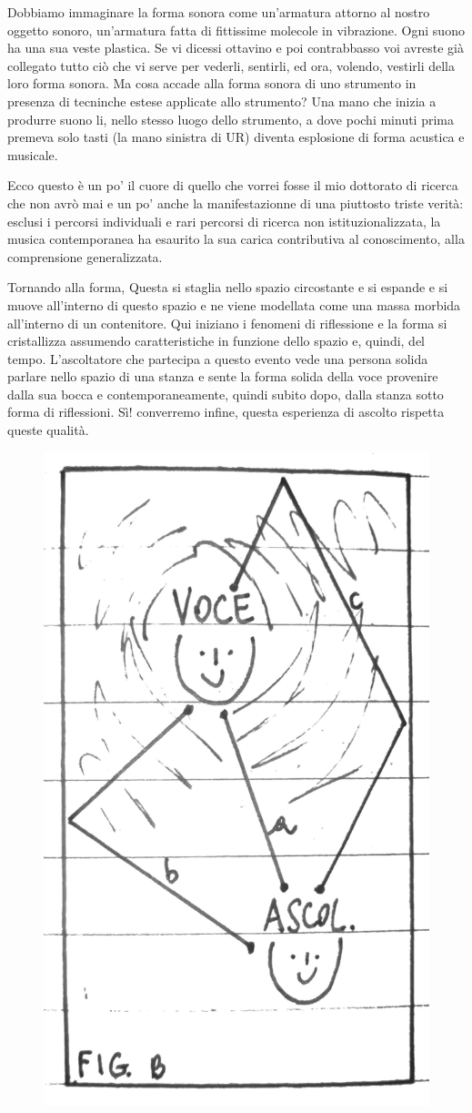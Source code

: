 Dobbiamo immaginare la forma sonora come un'armatura attorno al nostro oggetto
sonoro, un'armatura fatta di fittissime molecole in vibrazione. Ogni suono ha una
sua veste plastica. Se vi dicessi ottavino e poi contrabbasso voi avreste già
collegato tutto ciò che vi serve per vederli, sentirli, ed ora, volendo, vestirli
della loro forma sonora. Ma cosa accade alla forma sonora di uno strumento in
presenza di tecninche estese applicate allo strumento? Una mano che inizia a produrre
suono li, nello stesso luogo dello strumento, a dove pochi minuti prima premeva
solo tasti (la mano  sinistra di UR) diventa esplosione di forma acustica e musicale.

Ecco questo è un po' il cuore di quello che vorrei fosse il mio dottorato di
ricerca che non avrò mai e un po' anche la manifestazionne di una piuttosto
triste verità: esclusi i percorsi individuali e rari percorsi di ricerca
non istituzionalizzata, la musica contemporanea ha esaurito la sua carica
contributiva al conoscimento, alla comprensione generalizzata.

Tornando alla forma, Questa si staglia nello spazio circostante e si espande e si muove
all'interno di questo spazio e ne viene modellata come una massa morbida all'interno
di un contenitore. Qui iniziano i fenomeni di riflessione e la forma si
cristallizza assumendo caratteristiche in funzione dello spazio e, quindi, del tempo.
L'ascoltatore che partecipa a questo evento vede una persona solida parlare nello
spazio di una stanza e sente la forma solida della voce provenire dalla sua bocca
e contemporaneamente, quindi subito dopo, dalla stanza sotto forma di riflessioni.
Sì! converremo infine, questa esperienza di ascolto rispetta queste qualità.

\begin{figure}[h]
\begin{center}
  \includegraphics[width=.48\linewidth]{CAPITOLI/1000/IMG/figb.png}
\label{ee:figb}
\end{center}
\end{figure}

